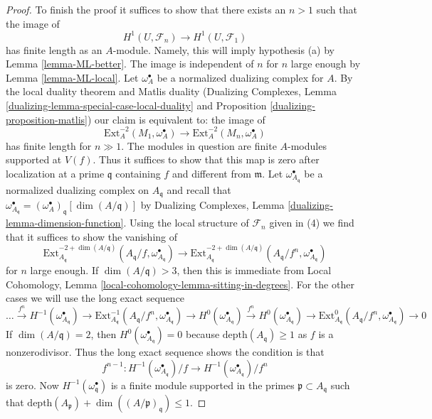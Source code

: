 \begin{proof}
\medskip\noindent
To finish the proof it suffices to show that there exists an $n > 1$
such that the image of
$$
H^1(U, \mathcal{F}_n) \longrightarrow H^1(U, \mathcal{F}_1)
$$
has finite length as an $A$-module. Namely, this will imply hypothesis (a)
by Lemma \ref{lemma-ML-better}. The image is independent
of $n$ for $n$ large enough by Lemma \ref{lemma-ML-local}.
Let $\omega_A^\bullet$ be a normalized dualizing complex for $A$.
By the local duality theorem and Matlis duality
(Dualizing Complexes, Lemma \ref{dualizing-lemma-special-case-local-duality}
and Proposition \ref{dualizing-proposition-matlis})
our claim is equivalent to: the image of
$$
\text{Ext}^{-2}_A(M_1, \omega_A^\bullet) \to
\text{Ext}^{-2}_A(M_n, \omega_A^\bullet)
$$
has finite length for $n \gg 1$. The modules in question are
finite $A$-modules supported at $V(f)$. Thus it suffices to show that this
map is zero after localization at a prime $\mathfrak q$
containing $f$ and different from $\mathfrak m$.
Let $\omega_{A_\mathfrak q}^\bullet$ be a normalized
dualizing complex on $A_\mathfrak q$ and recall that
$\omega_{A_\mathfrak q}^\bullet =
(\omega_A^\bullet)_\mathfrak q[\dim(A/\mathfrak q)]$ by
Dualizing Complexes, Lemma \ref{dualizing-lemma-dimension-function}.
Using the local structure of $\mathcal{F}_n$ given in (4)
we find that it suffices to show the vanishing of
$$
\text{Ext}^{-2 + \dim(A/\mathfrak q)}_{A_\mathfrak q}(
A_\mathfrak q/f, \omega_{A_\mathfrak q}^\bullet)
\to
\text{Ext}^{-2 + \dim(A/\mathfrak q)}_{A_\mathfrak q}(
A_\mathfrak q/f^n, \omega_{A_\mathfrak q}^\bullet)
$$
for $n$ large enough. If $\dim(A/\mathfrak q) > 3$, then this is immediate from
Local Cohomology, Lemma \ref{local-cohomology-lemma-sitting-in-degrees}.
For the other cases we will use the long exact sequence
$$
\ldots
\xrightarrow{f^n}
H^{-1}(\omega_{A_\mathfrak q}^\bullet)
\to
\text{Ext}^{-1}_{A_\mathfrak q}(
A_\mathfrak q/f^n, \omega_{A_\mathfrak q}^\bullet) \to
H^0(\omega_{A_\mathfrak q}^\bullet)
\xrightarrow{f^n}
H^0(\omega_{A_\mathfrak q}^\bullet)
\to
\text{Ext}^0_{A_\mathfrak q}(
A_\mathfrak q/f^n, \omega_{A_\mathfrak q}^\bullet) \to 0
$$
If $\dim(A/\mathfrak q) = 2$, then
$H^0(\omega_{A_\mathfrak q}^\bullet) = 0$
because $\text{depth}(A_\mathfrak q) \geq 1$ as
$f$ is a nonzerodivisor.
Thus the long exact sequence shows the condition is that
$$
f^{n - 1} :
H^{-1}(\omega_{A_\mathfrak q}^\bullet)/f \to
H^{-1}(\omega_{A_\mathfrak q}^\bullet)/f^n
$$
is zero. Now $H^{-1}(\omega^\bullet_\mathfrak q)$ is a finite
module supported in the primes $\mathfrak p \subset A_\mathfrak q$ such that
$\text{depth}(A_\mathfrak p) + \dim((A/\mathfrak p)_\mathfrak q) \leq 1$.

\end{proof}
